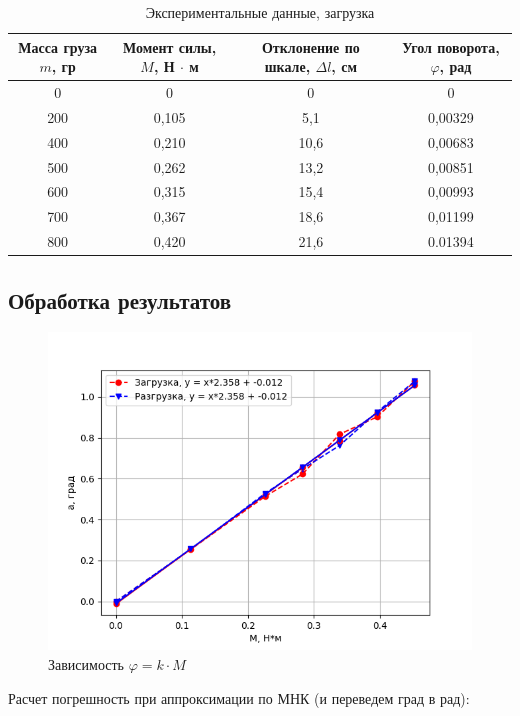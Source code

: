\documentclass[a4paper]{article}
\begin{document}
\begin{table}[h!]
\begin{center}
\begin{tabular}{|c|c|c|c|}
\hline
Масса груза $m$, гр & Момент силы, $M$, Н $\cdot$ м & Отклонение по шкале, $\Delta l$, см & Угол поворота, $\varphi$, рад \\ \hline
0                        & 0                             & 0                                   & 0                             \\ \hline
200                      & 0,105                         & 5,1                                 & 0,00329                  \\ \hline
400                      & 0,210                         & 10,6                                & 0,00683                     \\ \hline
500                      & 0,262                         & 13,2                                & 0,00851                      \\ \hline
600                      & 0,315                         & 15,4                                & 0,00993                          \\ \hline
700                      & 0,367                         & 18,6                                & 0,01199                      \\ \hline
800                      & 0,420                         & 21,6                                & 0.01394                       \\ \hline
\end{tabular}
\caption{Экспериментальные данные, загрузка}
\end{center}
\end{table}
    
\subsection{Обработка результатов}
\begin{figure}[p]
    \centering
    \includegraphics[scale=1.2]{rot.png}


    \caption{Зависимость $\varphi = k \cdot M$}
\end{figure}
Расчет погрешность при аппроксимации по МНК (и переведем град в рад):
\end{document}

